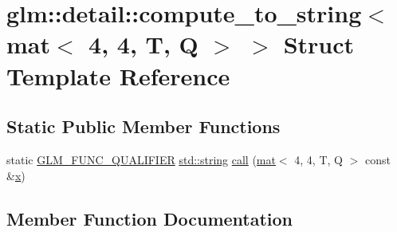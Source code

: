 \hypertarget{structglm_1_1detail_1_1compute__to__string_3_01mat_3_014_00_014_00_01_t_00_01_q_01_4_01_4}{}\section{glm\+:\+:detail\+:\+:compute\+\_\+to\+\_\+string$<$ mat$<$ 4, 4, T, Q $>$ $>$ Struct Template Reference}
\label{structglm_1_1detail_1_1compute__to__string_3_01mat_3_014_00_014_00_01_t_00_01_q_01_4_01_4}
\subsection*{Static Public Member Functions}
\begin{DoxyCompactItemize}
\item 
static \hyperlink{setup_8hpp_a33fdea6f91c5f834105f7415e2a64407}{G\+L\+M\+\_\+\+F\+U\+N\+C\+\_\+\+Q\+U\+A\+L\+I\+F\+I\+ER} \hyperlink{_s_d_l__opengl__glext_8h_ae84541b4f3d8e1ea24ec0f466a8c568b}{std\+::string} \hyperlink{structglm_1_1detail_1_1compute__to__string_3_01mat_3_014_00_014_00_01_t_00_01_q_01_4_01_4_a2bcb205f92a1451a9292f463bbb41288}{call} (\hyperlink{structglm_1_1mat}{mat}$<$ 4, 4, T, Q $>$ const \&\hyperlink{_s_d_l__opengl_8h_ad0e63d0edcdbd3d79554076bf309fd47}{x})
\end{DoxyCompactItemize}


\subsection{Member Function Documentation}
\mbox{\label{structglm_1_1detail_1_1compute__to__string_3_01mat_3_014_00_014_00_01_t_00_01_q_01_4_01_4_a2bcb205f92a1451a9292f463bbb41288}} 
